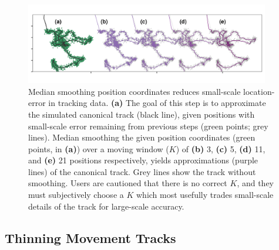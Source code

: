 \documentclass[10pt,paper=a4,headings=standardclasses
]{scrartcl}
\begin{document}
\begin{figure}[h!]
    \centering
    \includegraphics[width=0.95\textwidth]{figures/fig_03_median_smooth.png}
    \caption{Median smoothing position coordinates reduces small-scale location-error in tracking data. 
    \textbf{(a)} The goal of this step is to approximate the simulated canonical track (black line), given positions with small-scale error remaining from previous steps (green points; grey lines). 
    Median smoothing the given position coordinates (green points, in \textbf{(a)}) over a moving window ($K$) of \textbf{(b)} 3, \textbf{(c)} 5, \textbf{(d)} 11, and \textbf{(e)} 21 positions respectively, yields approximations (purple lines) of the canonical track.
    Grey lines show the track without smoothing.
    Users are cautioned that there is no correct $K$, and they must subjectively choose a $K$ which most usefully trades small-scale details of the track for large-scale accuracy.}
    \label{fig:figure_median_smooth}
\end{figure}

\subsection{Thinning Movement Tracks}
\end{document}
